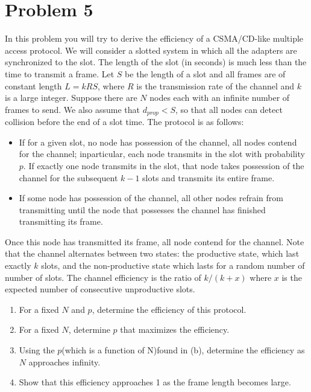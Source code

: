 \section*{Problem 5}

In this problem you will try to derive the efficiency of a CSMA/CD-like multiple access protocol.
We will consider a slotted system in which all the adapters are synchronized to the slot.
The length of the slot (in seconds) is much less than the time to transmit a frame.
Let $S$ be the length of a slot and all frames are of constant length $L=kRS$, where $R$ is the transmission rate of the channel and $k$ is a large integer.
Suppose there are $N$ nodes each with an infinite number of frames to send.
We also assume that $d_{prop} < S$, so that all nodes can detect collision before the end of a slot time.
The protocol is as follows:

\begin{itemize}
      \item If for a given slot, no node has possession of the channel, all nodes contend for the channel; inparticular, each node transmits in the slot with probability $p$.
            If exactly one node transmits in the slot, that node takes possession of the channel for the subsequent $k-1$ slots and transmits its entire frame.
      \item If some node has possession of the channel, all other nodes refrain from transmitting until the node that possesses the channel has finished transmitting its frame.
\end{itemize}

Once this node has transmitted its frame, all node contend for the channel.
Note that the channel alternates between two states: the productive state, which last exactly $k$ slots, and the non-productive state which lasts for a random number of number of slots.
The channel efficiency is the ratio of $k/(k+x)$ where $x$ is the expected number of consecutive unproductive slots.

\begin{enumerate}
      \item For a fixed $N$ and $p$, determine the efficiency of this protocol.
      \item For a fixed $N$, determine $p$ that maximizes the efficiency.
      \item Using the $p$(which is a function of N)found in (b), determine the efficiency as $N$ approaches infinity.
      \item Show that this efficiency approaches 1 as the frame length becomes large.
\end{enumerate}

